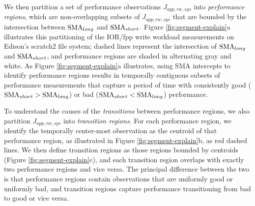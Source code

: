 We then partition a set of performance observations $J_{app, rw, sys}$ into \emph{performance regions}, which are non-overlapping subsets of $J_{app, rw, sys}$ that are bounded by the intersection between $\textup{SMA}_{long}$ and $\textup{SMA}_{short}$.
Figure \ref{fig:segment-explain}a illustrates this partitioning of the IOR/fpp write workload measurements on Edison's scratch2 file system;
dashed lines represent the intersection of $\textup{SMA}_{long}$ and $\textup{SMA}_{short}$, and performance regions are shaded in alternating gray and white.
As Figure \ref{fig:segment-explain}a illustrates, using SMA intercepts to identify performance regions results in temporally contiguous subsets of performance measurements that capture a period of time with consistently good (${\textup{SMA}_{short} > \textup{SMA}_{long}}$) or bad (${\textup{SMA}_{short} < \textup{SMA}_{long}}$) performance.

To understand the causes of the \emph{transitions} between performance regions, we also partition $J_{app, rw, sys}$ into \emph{transition regions}.
For each performance region, we identify the temporally center-most observation as the centroid of that performance region, as illustrated in Figure \ref{fig:segment-explain}b, as red dashed lines.
We then define transition regions as those regions bounded by centroids (Figure \ref{fig:segment-explain}c), and each transition region overlaps with exactly two performance regions and vice versa.
The principal difference between the two is that performance regions contain observations that are uniformly good or uniformly bad, and transition regions capture performance transitioning from bad to good or vice versa.

